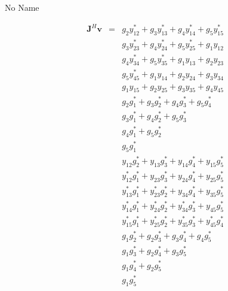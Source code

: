 \documentclass[a4paper,10pt]{article}
\begin{document}
\begin{section}{No Name}
 
\begin{eqnarray}
\boldsymbol{J}^H\boldsymbol{v} &=& g_2y_{12}^* + g_3y_{13}^* + g_4y_{14}^* + g_5y_{15}^*\\
&&g_3y_{23}^* + g_4y_{24}^* + g_5y_{25}^* + g_1y_{12}\\
&&g_4y_{34}^* + g_5y_{35}^* + g_1y_{13} + g_2y_{23}\\
&&g_5y_{45}^* + g_1y_{14} + g_2y_{24} + g_3y_{34}\\
&&g_1y_{15} + g_2y_{25} + g_3y_{35} + g_4y_{45}\\
&&g_2g_1^* + g_3g_2^* + g_4g_3^* + g_5g_4^*\\
&&g_3g_1^* + g_4g_2^* + g_5g_3^*\\
&&g_4g_1^* + g_5g_2^*\\
&&g_5g_1^*\\
&&y_{12}g_2^* + y_{13}g_3^* + y_{14}g_4^* + y_{15}g_5^*\\
&&y_{12}^*g_1^* + y_{23}g_3^* + y_{24}g_4^* + y_{25}g_5^*\\
&&y_{13}^*g_1^* + y_{23}^*g_2^* + y_{34}g_4^* + y_{35}g_5^*\\
&&y_{14}^*g_1^* + y_{24}^*g_2^* + y_{34}^*g_3^* + y_{45}g_5^*\\
&&y_{15}^*g_1^* + y_{25}^*g_2^* + y_{35}^*g_3^* + y_{45}^*g_4^*\\
&&g_1g_2^* + g_2g_3^* + g_3g_4^* + g_4g_5^*\\
&&g_1g_3^* + g_2g_4^* + g_3g_5^*\\
&&g_1g_4^* + g_2g_5^*\\
&&g_1g_5^*
\end{eqnarray}

\end{section}
\end{document}
